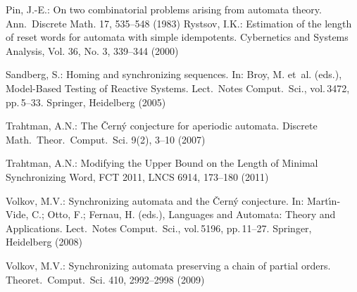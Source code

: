 \documentclass[11pt]{llncs}
\begin{document}
\begin{thebibliography}{99}
Pin, J.-E.: On two combinatorial problems arising from automata
theory. Ann.\ Discrete Math. 17, 535--548 (1983)
%
Rystsov, I.K.: Estimation of the length of reset words for automata with simple idempotents. 
Cybernetics and Systems Analysis, Vol. 36, No. 3, 339--344 (2000)


Sandberg, S.: Homing and synchronizing sequences. In: Broy, M.
et~al. (eds.), Model-Based Testing of Reactive Systems. Lect.\
Notes Comput.\ Sci., vol.\,3472, pp.\,5--33. Springer, Heidelberg
(2005)
%
%
%

Trahtman, A.N.: The \v{C}ern\'y conjecture for aperiodic automata.
Discrete Math.\ Theor.\ Comput.\ Sci. 9(2), 3--10 (2007)

Trahtman, A.N.: Modifying the Upper Bound on the Length of Minimal Synchronizing Word, FCT 2011, LNCS 6914, 173--180 (2011)

%

Volkov, M.V.: Synchronizing automata and the \v{C}ern\'{y}
conjecture. In: Mart\'\i{}n-Vide, C.; Otto, F.; Fernau, H. (eds.),
Languages and Automata: Theory and Applications. Lect.\ Notes
Comput.\ Sci., vol.\,5196, pp.\,11--27.  Springer, Heidelberg (2008)

Volkov, M.V.: Synchronizing automata preserving a chain of partial
orders. Theoret.\ Comput.\ Sci. 410, 2992--2998 (2009)
\end{thebibliography}
\end{document}
